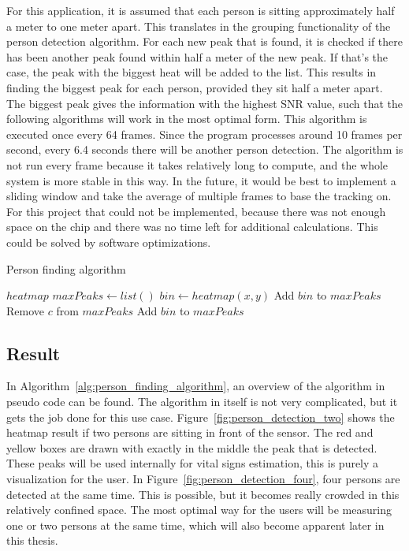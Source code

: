 For this application, it is assumed that each person is sitting approximately half a meter to one meter apart. This translates in the grouping functionality of the person detection algorithm. For each new peak that is found, it is checked if there has been another peak found within half a meter of the new peak. If that's the case, the peak with the biggest heat will be added to the list. This results in finding the biggest peak for each person, provided they sit half a meter apart. The biggest peak gives the information with the highest SNR value, such that the following algorithms will work in the most optimal form. This algorithm is executed once every 64 frames. Since the program processes around 10 frames per second, every 6.4 seconds there will be another person detection. The algorithm is not run every frame because it takes relatively long to compute, and the whole system is more stable in this way. In the future, it would be best to implement a sliding window and take the average of multiple frames to base the tracking on. For this project that could not be implemented, because there was not enough space on the chip and there was no time left for additional calculations. This could be solved by software optimizations.

\begin{algorithm}
\caption{Person finding algorithm}\label{alg:person_finding_algorithm}
\begin{algorithmic}
\Require $heatmap$
\State $maxPeaks \gets list()$
        \State $bin \gets heatmap(x, y)$
                        \State Add $bin$ to $maxPeaks$
                        \State Remove $c$ from $maxPeaks$
                    \EndIf
                \Else
                    \State Add $bin$ to $maxPeaks$
                \EndIf
            \EndIf
        \EndIf
    \EndFor
\EndFor
\end{algorithmic}
\end{algorithm}

\subsection{Result}
In Algorithm~\ref{alg:person_finding_algorithm}, an overview of the algorithm in pseudo code can be found. The algorithm in itself is not very complicated, but it gets the job done for this use case. Figure~\ref{fig:person_detection_two} shows the heatmap result if two persons are sitting in front of the sensor. The red and yellow boxes are drawn with exactly in the middle the peak that is detected. These peaks will be used internally for vital signs estimation, this is purely a visualization for the user. In Figure~\ref{fig:person_detection_four}, four persons are detected at the same time. This is possible, but it becomes really crowded in this relatively confined space. The most optimal way for the users will be measuring one or two persons at the same time, which will also become apparent later in this thesis. 

